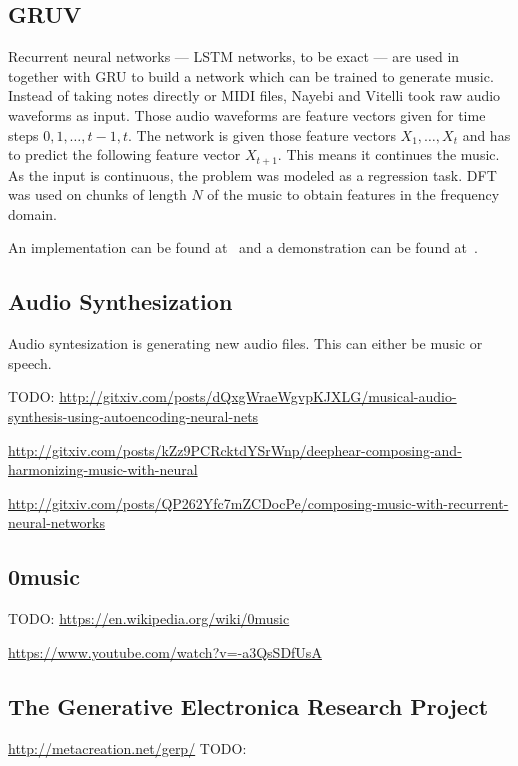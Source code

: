 \subsection{GRUV}

Recurrent neural networks --- \gls{LSTM} networks, to be exact --- are used
in~\cite{nayebigruv} together with \gls{GRU} to build a network which can be
trained to generate music. Instead of taking notes directly or MIDI files,
Nayebi and Vitelli took raw audio waveforms as input. Those audio waveforms are
feature vectors given for time steps $0, 1, \dots, t-1, t$. The network is
given those feature vectors $X_1, \dots, X_t$ and has to predict the following
feature vector $X_{t+1}$. This means it continues the music. As the input is
continuous, the problem was modeled as a regression task. \Gls{DFT} was used on
chunks of length $N$ of the music to obtain features in the frequency domain.

An implementation can be found at~\cite{gruvGitHub} and a demonstration can
be found at~\cite{Vitelli2015}.


\subsection{Audio Synthesization}
Audio syntesization is generating new audio files. This can either be music or
speech.

TODO: \href{http://gitxiv.com/posts/dQxgWraeWgvpKJXLG/musical-audio-synthesis-using-autoencoding-neural-nets}{http://gitxiv.com/posts/dQxgWraeWgvpKJXLG/musical-audio-synthesis-using-autoencoding-neural-nets}

\href{http://gitxiv.com/posts/kZz9PCRcktdYSrWnp/deephear-composing-and-harmonizing-music-with-neural}{http://gitxiv.com/posts/kZz9PCRcktdYSrWnp/deephear-composing-and-harmonizing-music-with-neural}

\href{http://gitxiv.com/posts/QP262Yfc7mZCDocPe/composing-music-with-recurrent-neural-networks}{http://gitxiv.com/posts/QP262Yfc7mZCDocPe/composing-music-with-recurrent-neural-networks}

\subsection{0music}
TODO: \href{https://en.wikipedia.org/wiki/0music}{https://en.wikipedia.org/wiki/0music}

\href{https://www.youtube.com/watch?v=-a3QsSDfUsA}{https://www.youtube.com/watch?v=-a3QsSDfUsA}



\subsection{The Generative Electronica Research Project}

\href{http://metacreation.net/gerp/}{http://metacreation.net/gerp/}
TODO: \cite{Eigenfeldt2013}
